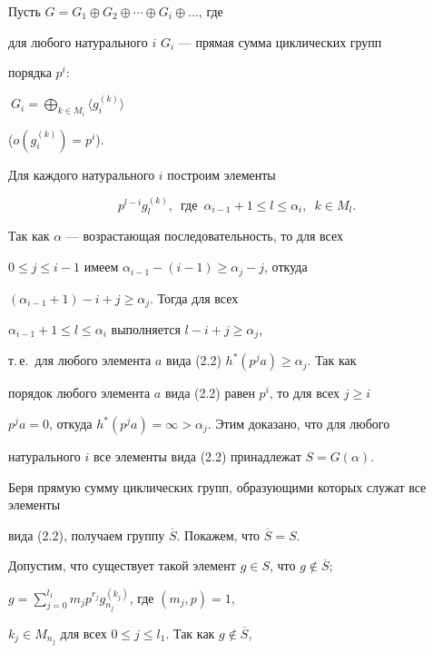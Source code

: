 \begin{pf}


Пусть $G=G_1\oplus G_2\oplus\dotsb\oplus G_i\oplus\dotsc$, где


для любого натурального $i$\; $G_i$ --- прямая сумма циклических групп


порядка $p^i$:


$\ G_i=\bigoplus\limits_{k\in M_i}\langle g_i^{(k)}\rangle$


($o(g_i^{(k)})=p^i$).





Для каждого натурального $i$ построим элементы


\begin{equation}


p^{l-i}g_l^{(k)},\ \; \text{где}\ \; \alpha_{i-1}+1\leq


l\leq \alpha_i,\ \; k\in M_l.


\end{equation}


Так как $\alpha$ --- возрастающая последовательность, то для всех


$0\leq j\leq i-1$ имеем $\alpha_{i-1}-(i-1)\geq \alpha_j-j$, откуда


$(\alpha_{i-1}+1)-i+j\geq \alpha_j$. Тогда для всех


$\alpha_{i-1}+1\leq l\leq \alpha_i$ выполняется $l-i+j\geq \alpha_j$,


т.\,е.\ для любого элемента $a$ вида (2.2) $h^*(p^ja)\geq \alpha_j$. Так как


порядок любого элемента $a$ вида (2.2) равен $p^i$, то для всех $j\geq i$\;


$p^ja=0$, откуда $h^*(p^ja)=\infty>\alpha_j$. Этим доказано, что для любого


натурального $i$ все элементы вида (2.2) принадлежат $S=G(\alpha)$.





Беря прямую сумму циклических групп, образующими которых служат все элементы


вида (2.2), получаем группу $\overline{S}$. Покажем, что $\overline{S}=S$.


Допустим, что существует такой элемент $g\in S$, что $g\notin\overline{S}$;


$g=\sum\limits_{j=0}^{l_1} m_j p^{r_j} g_{n_j}^{(k_j)}$, где $(m_j,p)=1$,


$k_j\in M_{n_j}$ для всех $0\leq j\leq l_1$. Так как $g\notin\overline{S}$,



\end{pf}
